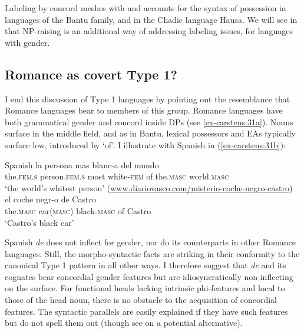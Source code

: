\documentclass[output=paper
,modfonts
,nonflat]{langsci/langscibook}
\begin{document}
Labeling by concord meshes with and accounts for the syntax of possession in languages of the Bantu family, and in the Chadic language Hausa. We will see in  that NP-raising is an additional way of addressing labeling issues, for languages with gender. 

\subsection{Romance as covert Type 1?} \label{sec-carstens:3.3}

I end this discussion of Type 1 languages by pointing out the resemblance that Romance languages bear to members of this group. Romance languages have both grammatical gender and concord inside DPs (see \ref{ex-carstens:31a}). Nouns surface in the middle field, and as in Bantu, lexical possessors and EAs typically surface low, introduced by ‘of’. I illustrate with Spanish in (\ref{ex-carstens:31b}):

\begin{exe}
	\ex Spanish \label{ex-carstens:31}
	\xlist
	\ex \label{ex-carstens:31a}
	\gll la           persona       mas   blanc-a      del mundo \\
	the.\textsc{fem}.\textsc{s}   person.\textsc{fem}.\textsc{s}   most white-\textsc{fem}     of.the.\textsc{masc} world.\textsc{masc}\\
	\glt `the world's whitest person'  	
	\ex (\url{www.diariovasco.com/misterio-coche-negro-castro})\label{ex-carstens:31b}\\
	\gll el       coche       negr-o      de Castro \\
	the.\textsc{masc} car(\textsc{masc})  black-\textsc{masc}  of Castro\\
	\glt `Castro's black car'
	\endxlist
\end{exe}
Spanish \textit{de} does not inflect for gender, nor do its counterparts in other Romance languages. Still, the morpho-syntactic facts are striking in their conformity to the canonical Type 1 pattern in all other ways. I therefore suggest that \textit{de} and its cognates bear concordial gender features but are idiosyncratically non-inflecting on the surface. For functional heads lacking intrinsic phi-features and local to those of the head noun, there is no obstacle to the acquisition of concordial features. The syntactic parallels are easily explained if they have such features but do not spell them out (though see  on a potential alternative).\largerpage[-1]   
\end{document}
